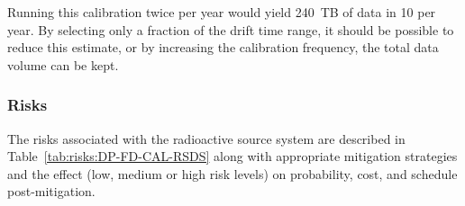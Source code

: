  Running this calibration twice per year would yield \num{240}~TB of data in \SI{10}{\kt} per year. By selecting only a fraction of the drift time range, it should be possible to reduce this estimate, or by increasing the calibration frequency, the total data volume can be kept. 

\subsubsection{Risks}
The risks associated with the radioactive source system are described in Table~\ref{tab:risks:DP-FD-CAL-RSDS} along with appropriate mitigation strategies and the effect (low, medium or high risk levels) on probability, cost, and schedule post-mitigation.





